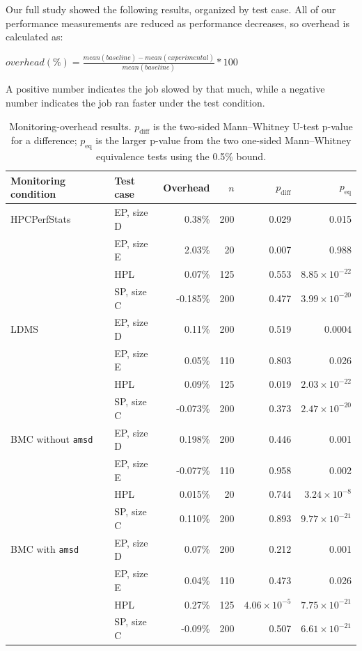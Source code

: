 \documentclass[conference]{IEEEtran}
\begin{document}
Our full study showed the following results, organized by test case. 
All of our performance measurements are reduced as performance decreases, so
overhead is calculated as:

\(overhead (\%) = \frac{mean(baseline)-mean(experimental)}{mean(baseline)}*100\)

A positive 
number indicates the job slowed by that much, while a negative number indicates 
the job ran faster under the test condition.

\begin{table}[!t]
\centering
\footnotesize
\setlength{\tabcolsep}{4pt}
\begin{tabular}{llrrrr}
\hline
Monitoring condition & Test case & Overhead & $n$ & $p_{\mathrm{diff}}$ & $p_{\mathrm{eq}}$ \\
\hline
HPCPerfStats & EP, size D & 0.38\% & 200 & 0.029 & 0.015 \\
             & EP, size E & 2.03\% & 20  & 0.007 & 0.988 \\
             & HPL        & 0.07\% & 125 & 0.553 & $8.85\times10^{-22}$ \\
             & SP, size C & -0.185\% & 200 & 0.477 & $3.99\times10^{-20}$ \\
\hline
LDMS         & EP, size D & 0.11\% & 200 & 0.519 & 0.0004 \\
             & EP, size E & 0.05\% & 110 & 0.803 & 0.026 \\
             & HPL        & 0.09\% & 125 & 0.019 & $2.03\times10^{-22}$ \\
             & SP, size C & -0.073\% & 200 & 0.373 & $2.47\times10^{-20}$ \\
\hline
BMC without \texttt{amsd} & EP, size D & 0.198\% & 200 & 0.446 & 0.001 \\
             & EP, size E & -0.077\% & 110 & 0.958 & 0.002 \\
             & HPL        & 0.015\% & 20 & 0.744 & $3.24\times10^{-8}$ \\
             & SP, size C & 0.110\% & 200 & 0.893 & $9.77\times10^{-21}$ \\
\hline
BMC with \texttt{amsd} & EP, size D & 0.07\% & 200 & 0.212 & 0.001 \\
             & EP, size E & 0.04\% & 110 & 0.473 & 0.026 \\
             & HPL        & 0.27\% & 125 & $4.06\times10^{-5}$ & $7.75\times10^{-21}$ \\
             & SP, size C & -0.09\% & 200 & 0.507 & $6.61\times10^{-21}$ \\
\hline
\end{tabular}
\caption{Monitoring-overhead results. $p_{\mathrm{diff}}$ is the two-sided Mann--Whitney U-test p-value for a difference; $p_{\mathrm{eq}}$ is the larger p-value from the two one-sided Mann--Whitney equivalence tests using the 0.5\% bound.}
\label{table:results_all}
\end{table}
\end{document}

